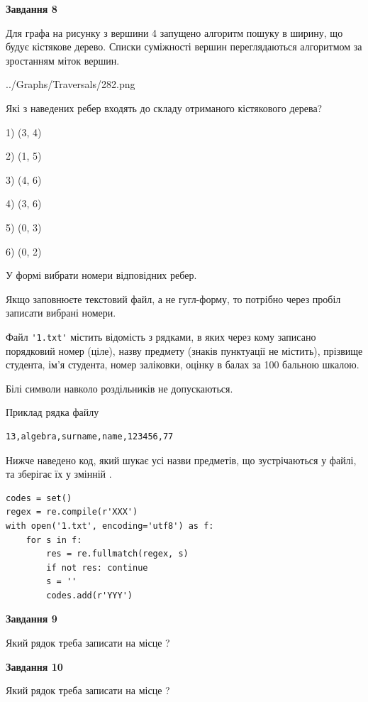 \documentclass[12pt, ukrainian]{article}
\def\code#1{\Verb!#1!}
\begin{document}
{\begin {large}
{\begin {center}\textbf{Завдання 8}\end {center}}\par
Для графа на рисунку з вершини 4 запущено алгоритм пошуку в ширину, що будує кістякове дерево. Списки суміжності вершин переглядаються алгоритмом за зростанням міток вершин.\par
\begin{center}
	{../Graphs/Traversals/282.png}
\end{center}
\par Які з наведених ребер входять до складу отриманого кістякового дерева?\par
1) (3, 4)\par
2) (1, 5)\par
3) (4, 6)\par
4) (3, 6)\par
5) (0, 3)\par
6) (0, 2)\par
{\vskip 15pt} У формі вибрати номери відповідних ребер.


Якщо заповнюєте текстовий файл, а не гугл-форму, то потрібно через пробіл записа\-ти вибрані номери.\par
\newpage


Файл \code{'1.txt'} містить відомість з рядками, в яких через кому записано поряд\-ковий номер (ціле), назву предмету (знаків пунктуації не містить), прізвище студента, ім'я студента, номер заліковки, оцінку в балах за 100 бальною шкалою.

Білі символи навколо роздільників не допускаються.

Приклад рядка файлу



\begin{verbatim}
13,algebra,surname,name,123456,77
\end{verbatim}


Нижче наведено код, який шукає усі назви предметів, що зустрічаються у файлі, та зберігає їх у змінній .



\begin{verbatim}
codes = set()
regex = re.compile(r'XXX')
with open('1.txt', encoding='utf8') as f:
    for s in f:
        res = re.fullmatch(regex, s)
        if not res: continue
        s = ''
        codes.add(r'YYY')
\end{verbatim}


{\begin {center}\textbf{Завдання 9}\end {center}}\par
Який рядок треба записати на місце  ?\par
\vspace{5mm}


{\begin {center}\textbf{Завдання 10}\end {center}}\par
Який рядок треба записати на місце  ?\par


\newpage


\end {large}}
\end{document}
